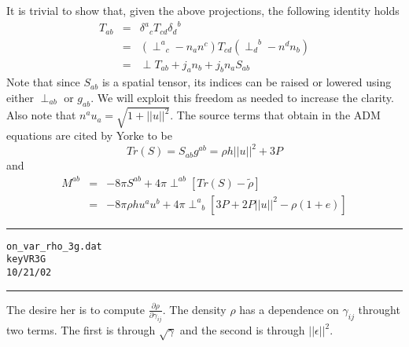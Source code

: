 \documentclass[12pt]{article}
\begin{document}
It is trivial to show that, given the above projections, the following
identity holds
\begin{eqnarray}\label{3P1IF_5}
{ T } _ { ab } & = & {\delta ^ a}_{c} { T } _ { cd } {\delta _ d}^{b} \nonumber \\
& = & \left( {\perp ^ a}_{ c } - {n _ a} {n ^ c} \right)
{ T } _ { cd }
\left( {\perp _ d}^{ b } - {n ^ d} {n _ b} \right) \nonumber \\
& = & \perp { T } _ { ab } + { j } _ { a } {n _ b} + { j } _ { b } {n _ a}
{ S } _ { ab }
\end{eqnarray}
Note that since $ { S } _ { ab } $ is a spatial tensor, its indices can
be raised or lowered using either $ {\perp } _ { a b } $ or $ {g}_{a b} $. We will
exploit this freedom as needed to increase the clarity. Also note
that $ {n ^ a} {u}_{a} = \sqrt{ 1 + || u || ^2 } $.
The source terms that obtain in the ADM equations are cited by Yorke to be
\begin{equation}\label{3P1IF_6}
Tr( S ) = { S } _ { ab } {g}^{a b} = \rho h || u || ^2 + 3 P
\end{equation}
and
\begin{eqnarray}\label{3P1IF_7}
{ M } ^ { ab } & = & -8 \pi { S } ^ { ab } + 4 \pi {\perp } ^ { a b } \left[ Tr(S) - {\tilde \rho} \right] \nonumber \\
& = & -8 \pi \rho h { u } ^ { a } { u } ^ { b }
+ 4 \pi {\perp ^ a}_{ b } \left[ 3 P + 2 P || u || ^2 - \rho ( 1 + e ) \right]
\end{eqnarray}
\clearpage
\vspace{5mm}
\hrule
\begin{alltt}
  on_var_rho_3g.dat
  key VR3G
  10/21/02
\end{alltt}
\hrule
\vspace{5mm}

The desire her is to compute $ \frac{\partial \rho}{\partial {\gamma}_{i j}} $.
The density $ \rho $ has
a dependence on $ {\gamma}_{i j} $ throught two terms. The first is through
$ \sqrt{\gamma} $ and the second is through $ || \epsilon || ^2 $.
\end{document}
